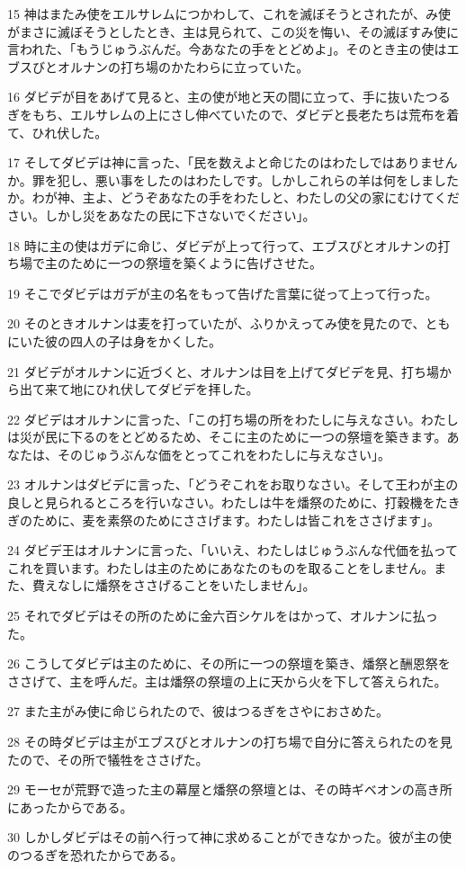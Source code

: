 \par 15 神はまたみ使をエルサレムにつかわして、これを滅ぼそうとされたが、み使がまさに滅ぼそうとしたとき、主は見られて、この災を悔い、その滅ぼすみ使に言われた、「もうじゅうぶんだ。今あなたの手をとどめよ」。そのとき主の使はエブスびとオルナンの打ち場のかたわらに立っていた。
\par 16 ダビデが目をあげて見ると、主の使が地と天の間に立って、手に抜いたつるぎをもち、エルサレムの上にさし伸べていたので、ダビデと長老たちは荒布を着て、ひれ伏した。
\par 17 そしてダビデは神に言った、「民を数えよと命じたのはわたしではありませんか。罪を犯し、悪い事をしたのはわたしです。しかしこれらの羊は何をしましたか。わが神、主よ、どうぞあなたの手をわたしと、わたしの父の家にむけてください。しかし災をあなたの民に下さないでください」。
\par 18 時に主の使はガデに命じ、ダビデが上って行って、エブスびとオルナンの打ち場で主のために一つの祭壇を築くように告げさせた。
\par 19 そこでダビデはガデが主の名をもって告げた言葉に従って上って行った。
\par 20 そのときオルナンは麦を打っていたが、ふりかえってみ使を見たので、ともにいた彼の四人の子は身をかくした。
\par 21 ダビデがオルナンに近づくと、オルナンは目を上げてダビデを見、打ち場から出て来て地にひれ伏してダビデを拝した。
\par 22 ダビデはオルナンに言った、「この打ち場の所をわたしに与えなさい。わたしは災が民に下るのをとどめるため、そこに主のために一つの祭壇を築きます。あなたは、そのじゅうぶんな価をとってこれをわたしに与えなさい」。
\par 23 オルナンはダビデに言った、「どうぞこれをお取りなさい。そして王わが主の良しと見られるところを行いなさい。わたしは牛を燔祭のために、打穀機をたきぎのために、麦を素祭のためにささげます。わたしは皆これをささげます」。
\par 24 ダビデ王はオルナンに言った、「いいえ、わたしはじゅうぶんな代価を払ってこれを買います。わたしは主のためにあなたのものを取ることをしません。また、費えなしに燔祭をささげることをいたしません」。
\par 25 それでダビデはその所のために金六百シケルをはかって、オルナンに払った。
\par 26 こうしてダビデは主のために、その所に一つの祭壇を築き、燔祭と酬恩祭をささげて、主を呼んだ。主は燔祭の祭壇の上に天から火を下して答えられた。
\par 27 また主がみ使に命じられたので、彼はつるぎをさやにおさめた。
\par 28 その時ダビデは主がエブスびとオルナンの打ち場で自分に答えられたのを見たので、その所で犠牲をささげた。
\par 29 モーセが荒野で造った主の幕屋と燔祭の祭壇とは、その時ギベオンの高き所にあったからである。
\par 30 しかしダビデはその前へ行って神に求めることができなかった。彼が主の使のつるぎを恐れたからである。

